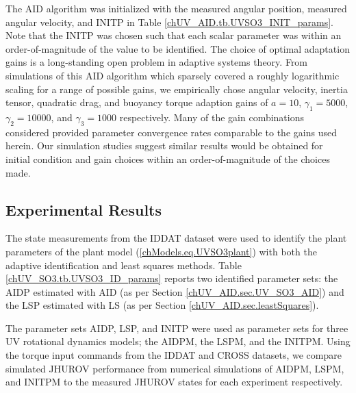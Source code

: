 The \ac{AID} algorithm was initialized with the measured angular position,
measured angular velocity, and \acf{INITP} in Table
\ref{chUV_AID.tb.UVSO3_INIT_params}.
%
Note that the \ac{INITP} was chosen such that each scalar
parameter was within an order-of-magnitude of the value to be identified.
%
The choice of optimal adaptation gains is a long-standing open problem
in adaptive systems theory\cite{Nguyen-2009,ksn&anu.book}.
%
From simulations of this \ac{AID} algorithm which sparsely covered a 
roughly logarithmic scaling for a range of possible gains, we
empirically chose angular velocity, inertia tensor, quadratic drag,
and buoyancy torque adaption gains of $a=10$, $\gamma_1=5000$,
$\gamma_2=10000$, and $\gamma_3=1000$ respectively.
%
Many of the gain combinations considered provided parameter
convergence rates comparable to the gains used herein.
%
Our simulation studies suggest similar results would be obtained for
initial condition and gain choices within an order-of-magnitude of the
choices made.





\subsection{Experimental Results}%


The state measurements from the \ac{IDDAT} dataset were used to
identify the plant parameters of the plant model
(\ref{chModels.eq.UVSO3plant}) with both the adaptive identification
and least squares methods.
%
Table \ref{chUV_SO3.tb.UVSO3_ID_params} reports two identified
parameter sets: the \acf{AIDP} estimated with \ac{AID} (as per Section
\ref{chUV_AID.sec.UV_SO3_AID}) and the \acf{LSP} estimated with
\ac{LS} (as per Section \ref{chUV_AID.sec.leastSquares}). 
%

The parameter sets \ac{AIDP},  \ac{LSP}, and \ac{INITP} were used as
parameter sets for three \ac{UV} rotational dynamics models; the
\acf{AIDPM}, the \acf{LSPM}, and the \acf{INITPM}.
%
Using the torque input commands from the \ac{IDDAT} and \ac{CROSS}
datasets, we compare simulated \ac{JHUROV} performance from numerical
simulations of \ac{AIDPM}, \ac{LSPM}, and \ac{INITPM} to the measured
\ac{JHUROV} states for each experiment respectively.

